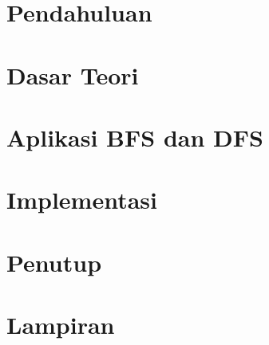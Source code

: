 \documentclass[12pt,a4paper]{report}
\begin{document}
	\clearpage
	\setcounter{page}{1}
	\hypersetup{pageanchor=true}
	\pagestyle{fancy}
	
	\tableofcontents
	\clearpage
	\setcounter{page}{1}
	
	\chapter{Pendahuluan}
	
	
	\chapter{Dasar Teori}
	
	
	\chapter{Aplikasi BFS dan DFS}
	
	
	\chapter{Implementasi}
	
	
	\chapter{Penutup}
	

	\chapter{Lampiran}
	
	
	
	
\end{document}
